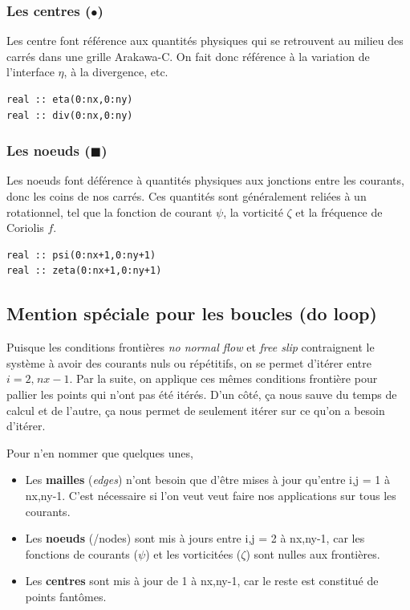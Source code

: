 \documentclass[10pt]{article}
\numberwithin{equation}{section}
\newcommand{\pt}{\hspace{1pt}}
\begin{document}
\subsubsection{Les centres (\(\bullet\))}
\label{sec:org3d53550}
Les centre font référence aux quantités physiques qui se retrouvent au milieu des carrés dans une grille Arakawa-C.
On fait donc référence à la variation de l'interface \(\eta\), à la divergence, etc.
\begin{verbatim}
real :: eta(0:nx,0:ny)
real :: div(0:nx,0:ny)
\end{verbatim}


\subsubsection{Les noeuds (\(\blacksquare\))}
\label{sec:orgf967a6a}
Les noeuds font déférence à quantités physiques aux jonctions entre les courants, donc les coins de nos carrés.
Ces quantités sont généralement reliées à un rotationnel, tel que la fonction de courant \(\psi\), la vorticité \(\zeta\) et la fréquence de Coriolis \(f\).
\begin{verbatim}
real :: psi(0:nx+1,0:ny+1)
real :: zeta(0:nx+1,0:ny+1)
\end{verbatim}

\subsection{Mention spéciale pour les boucles (do loop)}
\label{sec:org0b1a908}

Puisque les conditions frontières \emph{no normal flow} et \emph{free slip} contraignent le système à avoir des courants nuls ou répétitifs, on se permet d'itérer entre \(i=2,\pt nx-1\).
Par la suite, on applique ces mêmes conditions frontière pour pallier les points qui n'ont pas été itérés.
D'un côté, ça nous sauve du temps de calcul et de l'autre, ça nous permet de seulement itérer sur ce qu'on a besoin d'itérer.\bigskip

Pour n'en nommer que quelques unes,
\begin{itemize}
\item Les \textbf{mailles} (\emph{edges}) n'ont besoin que d'être mises à jour qu'entre i,\pt j = 1 à nx,\pt ny-1.
C'est nécessaire si l'on veut veut faire nos applications sur tous les courants.
\item Les \textbf{noeuds} (/nodes) sont mis à jours entre i,\pt j = 2 à nx,\pt ny-1, car les fonctions de courants (\(\psi\)) et les vorticitées (\(\zeta\)) sont nulles aux frontières.
\item Les \textbf{centres} sont mis à jour de 1 à nx,\pt ny-1, car le reste est constitué de points fantômes.
\end{itemize}
\end{document}
